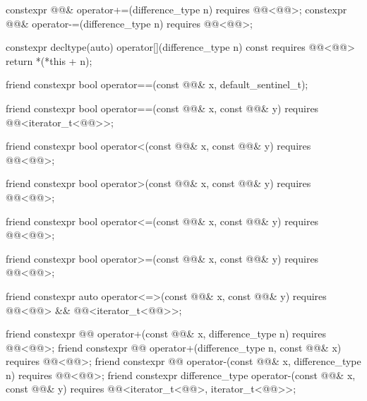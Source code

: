 \begin{codeblock}
{{    constexpr @@& operator+=(difference_type n) requires @@<@@>;
    constexpr @@& operator-=(difference_type n) requires @@<@@>;

    constexpr decltype(auto) operator[](difference_type n) const
      requires @@<@@>
    { return *(*this + n); }

    friend constexpr bool operator==(const @@& x, default_sentinel_t);

    friend constexpr bool operator==(const @@& x, const @@& y)
      requires @@<iterator_t<@@>>;

    friend constexpr bool operator<(const @@& x, const @@& y)
      requires @@<@@>;

    friend constexpr bool operator>(const @@& x, const @@& y)
      requires @@<@@>;

    friend constexpr bool operator<=(const @@& x, const @@& y)
      requires @@<@@>;

    friend constexpr bool operator>=(const @@& x, const @@& y)
      requires @@<@@>;

    friend constexpr auto operator<=>(const @@& x, const @@& y)
        requires @@<@@> && @@<iterator_t<@@>>;

    friend constexpr @@ operator+(const @@& x, difference_type n)
      requires @@<@@>;
    friend constexpr @@ operator+(difference_type n, const @@& x)
      requires @@<@@>;
    friend constexpr @@ operator-(const @@& x, difference_type n)
      requires @@<@@>;
    friend constexpr difference_type operator-(const @@& x, const @@& y)
      requires @@<iterator_t<@@>, iterator_t<@@>>;

}}
\end{codeblock}
